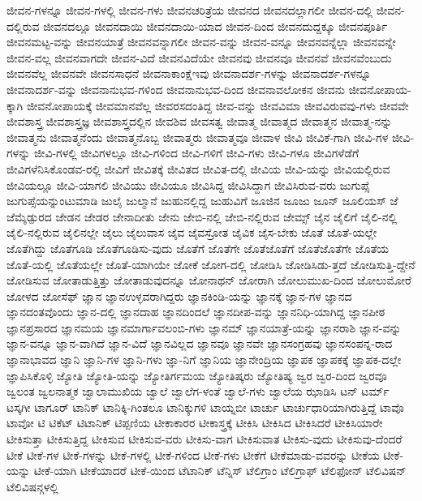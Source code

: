 {ಜೀವನ-ಗಳನ್ನೂ
ಜೀವನ-ಗಳಲ್ಲಿ
ಜೀವನ-ಗಳು
ಜೀವನಚರಿತ್ರೆಯ
ಜೀವನದ
ಜೀವನದಲ್ಲಾಗಲೀ
ಜೀವನ-ದಲ್ಲಿ
ಜೀವನ-ದಲ್ಲಿರುವ
ಜೀವನದಲ್ಲೂ
ಜೀವನದಾಯಿ
ಜೀವನದಾಯಿ-ಯಾದ
ಜೀವನ-ದಿಂದ
ಜೀವನದುದ್ದಕ್ಕೂ
ಜೀವನಪೂರ್ತಿ
ಜೀವನಮಟ್ಟ-ವನ್ನು
ಜೀವನಯಾತ್ರೆ
ಜೀವನವನ್ನಾಗಲೀ
ಜೀವನ-ವನ್ನು
ಜೀವನ-ವನ್ನೂ
ಜೀವನವನ್ನೆಲ್ಲಾ
ಜೀವನವನ್ನೇ
ಜೀವನ-ವಲ್ಲ
ಜೀವನವಾಗದೇ
ಜೀವನ-ವಿದೆ
ಜೀವನವಿದೆಯೇ
ಜೀವನವು
ಜೀವನವೂ
ಜೀವನವೆ
ಜೀವನವೆಂಬುದು
ಜೀವನವೆಲ್ಲ
ಜೀವನವೇ
ಜೀವನಸಾಧನೆ
ಜೀವನಾಕಾಂಕ್ಷೆಇವು
ಜೀವನಾದರ್ಶ-ಗಳನ್ನು
ಜೀವನಾದರ್ಶ-ಗಳನ್ನೂ
ಜೀವನಾದರ್ಶ-ವನ್ನು
ಜೀವನಾನುಭವ-ಗಳಿಂದ
ಜೀವನಾನುಭವ-ದಿಂದ
ಜೀವನಾವಲೋಕನ
ಜೀವನು
ಜೀವನೋಪಾಯ-ಕ್ಕಾಗಿ
ಜೀವನೋಪಾಯಕ್ಕೆ
ಜೀವಮಾನವೆಲ್ಲ
ಜೀವರಸದಂತಿದ್ದ
ಜೀವ-ವನ್ನು
ಜೀವವಿಮಾ
ಜೀವವಿರುವವು-ಗಳು
ಜೀವವೇ
ಜೀವಶಾಸ್ತ್ರ
ಜೀವಶಾಸ್ತ್ರಜ್ಞ
ಜೀವಶಾಸ್ತ್ರದಲ್ಲಿನ
ಜೀವಶಿವ
ಜೀವಸತ್ವ
ಜೀವಾತ್ಮ
ಜೀವಾತ್ಮದ
ಜೀವಾತ್ಮನ
ಜೀವಾತ್ಮ-ನನ್ನು
ಜೀವಾತ್ಮನು
ಜೀವಾತ್ಮನೆಂದು
ಜೀವಾತ್ಮನೊಬ್ಬ
ಜೀವಾತ್ಮರು
ಜೀವಾತ್ಮವೂ
ಜೀವಾಳ
ಜೀವಿ
ಜೀವಿಕೆ-ಗಾಗಿ
ಜೀವಿ-ಗಳ
ಜೀವಿ-ಗಳನ್ನು
ಜೀವಿ-ಗಳಲ್ಲಿ
ಜೀವಿಗಳಲ್ಲೂ
ಜೀವಿ-ಗಳಿಂದ
ಜೀವಿ-ಗಳಿಗೆ
ಜೀವಿ-ಗಳು
ಜೀವಿ-ಗಳೂ
ಜೀವಿಗಳೆಡೆಗೆ
ಜೀವಿಗಳೆನಿಸಿಕೊಂಡವ-ರಲ್ಲಿ
ಜೀವಿಗೆ
ಜೀವಿತಕ್ಕೆ
ಜೀವಿತದ
ಜೀವಿತ-ದಲ್ಲಿ
ಜೀವಿಯ
ಜೀವಿ-ಯನ್ನು
ಜೀವಿಯಲ್ಲಿರುವ
ಜೀವಿಯಲ್ಲೂ
ಜೀವಿ-ಯಾಗಲಿ
ಜೀವಿಯು
ಜೀವಿಯೂ
ಜೀವಿಸಿದ್ದ
ಜೀವಿಸಿದ್ದಾಗ
ಜೀವಿಸಿರುವ-ವರು
ಜುಗುಪ್ಸೆ
ಜುಗುಪ್ಸೆಯನ್ನುಂಟುಮಾಡಿ
ಜುಲೈ
ಜುಲ್ಮಾನೆ
ಜುಹುನಲ್ಲಿದ್ದ
ಜುಹುವಿಗೆ
ಜೂಜಿನ
ಜೂಜು
ಜೂನ್
ಜೂಲಿಯಸ್
ಜೆ
ಜೆಮ್ಶೆಡ್ಪುರದ
ಜೇಡನ
ಜೇಡರ
ಜೇನಾದೀತು
ಜೇನು
ಜೇಬಿ-ನಲ್ಲಿ
ಜೇಬಿ-ನಲ್ಲಿರುವ
ಜೇಮ್ಸ್
ಜೈನ
ಜೈಲಿಗೆ
ಜೈಲಿ-ನಲ್ಲಿ
ಜೈಲಿ-ನಲ್ಲಿರುವ
ಜೈಲಿನಲ್ಲೇ
ಜೈಲು
ಜೈಲುವಾಸ
ಜೈವ
ಜೈವಸ್ರೋತ
ಜೈವಿಕ
ಜೈಸ-ಬೇಕು
ಜೊತೆ
ಜೊತೆ-ಯಲ್ಲೇ
ಜೊತೆಗಿದ್ದು
ಜೊತೆಗೂಡಿ
ಜೊತೆಗೂಡಿಸು-ವುದು
ಜೊತೆಗೆ
ಜೊತೆಗೇ
ಜೊತೆಜೊತೆಗೆ
ಜೊತೆಜೊತೆಗೇ
ಜೊತೆಯ
ಜೊತೆ-ಯಲ್ಲಿ
ಜೊತೆಯಲ್ಲೇ
ಜೊತೆ-ಯಾಗಿಯೇ
ಜೋಕೆ
ಜೋಗ-ದಲ್ಲಿ
ಜೋಡಿಸಿ
ಜೋಡಿಸಿಡು-ತ್ತದೆ
ಜೋಡಿಸುತ್ತಿ-ದ್ದೇನೆ
ಜೋಡಿಸುವ
ಜೋತಾಡುತ್ತಿತ್ತು
ಜೋತಾಡುವುದನ್ನೂ
ಜೋನಾಥನ್
ಜೋರಾಗಿ
ಜೋಲುಮುಖ-ದಿಂದ
ಜೋಲುಮೋರೆ
ಜೋಳದ
ಜೋಸೆಫ್
ಜ್ಞಾನ
ಜ್ಞಾನಉಳ್ಳವರಾಗಿದ್ದರು
ಜ್ಞಾನಕಿಂಡಿ-ಯನ್ನು
ಜ್ಞಾನಕ್ಕೆ
ಜ್ಞಾನ-ಗಳ
ಜ್ಞಾನದ
ಜ್ಞಾನದಂತವೊಂದು
ಜ್ಞಾನ-ದಲ್ಲಿ
ಜ್ಞಾನದಾಹ
ಜ್ಞಾನದಿಂದಲೆ
ಜ್ಞಾನದೀಪ-ವನ್ನು
ಜ್ಞಾನನಿಧಿ-ಯಾಗಿದ್ದ
ಜ್ಞಾನಪೀಠ
ಜ್ಞಾನಪ್ರಸಾರದ
ಜ್ಞಾನಮಯ
ಜ್ಞಾನಮಾರ್ಗಾವಲಂಬಿ-ಗಳು
ಜ್ಞಾನಮ್
ಜ್ಞಾನಯಾತ್ರೆ-ಯನ್ನು
ಜ್ಞಾನರಾಶಿ
ಜ್ಞಾನ-ವನ್ನು
ಜ್ಞಾನ-ವನ್ನೂ
ಜ್ಞಾನ-ವಾಗಿದೆ
ಜ್ಞಾನ-ವಿದೆ
ಜ್ಞಾನವಿಲ್ಲದ
ಜ್ಞಾನವೂ
ಜ್ಞಾನವೇ
ಜ್ಞಾನಸಂಗ್ರಹವು
ಜ್ಞಾನಸಂಪನ್ನ-ರಾದ
ಜ್ಞಾನಾಭಾವದ
ಜ್ಞಾನಿ
ಜ್ಞಾನಿ-ಗಳ
ಜ್ಞಾನಿ-ಗಳು
ಜ್ಞಾ-ನಿಗೆ
ಜ್ಞಾನಿಯ
ಜ್ಞಾನೇಂದ್ರಿಯ
ಜ್ಞಾಪಕ
ಜ್ಞಾಪಕಕ್ಕೆ
ಜ್ಞಾಪಕ-ದಲ್ಲೇ
ಜ್ಞಾಪಿಸಿಕೊಳ್ಳಿ
ಜ್ಯೋತಿ
ಜ್ಯೋತಿ-ಯನ್ನು
ಜ್ಯೋತಿರ್ಗಮಯ
ಜ್ಯೋತಿಷ್ಕರು
ಜ್ಯೋತಿಷ್ಯ
ಜ್ವರ
ಜ್ವರ-ದಿಂದ
ಜ್ವರವೂ
ಜ್ವಲಂತ
ಜ್ವಲನಾತ್ಮಕ
ಜ್ವಾಲಾಮುಖಿಯ
ಜ್ವಾಲೆ
ಜ್ವಾಲೆಗ-ಳಂತೆ
ಜ್ವಾಲೆ-ಗಳು
ಜ್ವಾಲೆಯ
ಝಾಡಿಸಿ
ಟನ್
ಟರ್ಮ್
ಟಸ್ಕಗೀ
ಟಾಗೂರ್
ಟಾನಿಕ್
ಟಾನಿಕ್ಕಿ-ಗಿಂತಲೂ
ಟಾನಿಕ್ಕುಗಳಿ
ಟಾಯ್ನಬೀ
ಟಾರ್ಚು
ಟಾರ್ಚುಧಾರಿಯಾಗಿರುತ್ತಿದ್ದೆ
ಟಾವೊ
ಟಾವೋ
ಟಿ
ಟಿಕೆಟ್
ಟಿಟಾನಿಕ್
ಟಿಪ್ಪಣಿಯ
ಟೀಕಾಕಾರರ
ಟೀಕಾಸ್ತ್ರಕ್ಕೆ
ಟೀಕಿಸಿ
ಟೀಕಿಸಿದ
ಟೀಕಿಸಿದರೆ
ಟೀಕಿಸಿಯಾರೇ
ಟೀಕಿಸುತ್ತಾ
ಟೀಕಿಸುತ್ತಿದ್ದ
ಟೀಕಿಸುವ
ಟೀಕಿಸುವ-ವರು
ಟೀಕಿಸು-ವಾಗ
ಟೀಕಿಸುವಾತ
ಟೀಕಿಸು-ವುದು
ಟೀಕಿಸುವು-ದೆಂದರೆ
ಟೀಕೆ
ಟೀಕೆ-ಗಳ
ಟೀಕೆ-ಗಳನ್ನು
ಟೀಕೆ-ಗಳಲ್ಲಿ
ಟೀಕೆ-ಗಳಿಂದ
ಟೀಕೆ-ಗಳು
ಟೀಕೆಗೆ
ಟೀಕೆಮಾಡು-ವವರನ್ನು
ಟೀಕೆಯ
ಟೀಕೆ-ಯನ್ನು
ಟೀಕೆ-ಯಾಗಿ
ಟೀಕೆಯಾದರೆ
ಟೀಕೆ-ಯಿಂದ
ಟೆಟಾನಿಕ್
ಟೆನ್ನಿಸ್
ಟೆಲಿಗ್ರಾಂ
ಟೆಲಿಗ್ರಾಫ್
ಟೆಲಿಫೋನ್
ಟೆಲಿವಿಷನ್
ಟೆಲಿವಿಷನ್ಗಳಲ್ಲಿ
}
